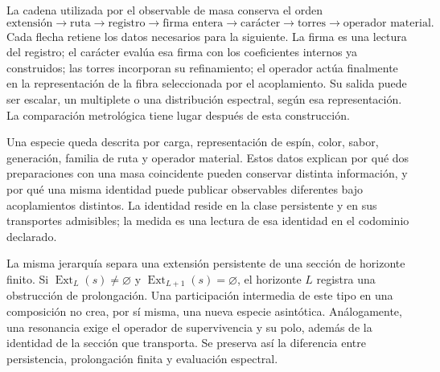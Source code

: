 La cadena utilizada por el observable de masa conserva el orden
\begin{equation}
 \text{extensión}\longrightarrow\text{ruta}\longrightarrow
 \text{registro}\longrightarrow\text{firma entera}\longrightarrow
 \text{carácter}\longrightarrow\text{torres}\longrightarrow
 \text{operador material}.
 \label{vi:vi:eq:cadena-material}
\end{equation}
Cada flecha retiene los datos necesarios para la siguiente. La firma es
una lectura del registro; el carácter evalúa esa firma con los
coeficientes internos ya construidos; las torres incorporan su
refinamiento; el operador actúa finalmente en la representación de la
fibra seleccionada por el acoplamiento. Su salida puede ser escalar,
un multiplete o una distribución espectral, según esa representación.
La comparación metrológica tiene lugar después de esta construcción.

Una especie queda descrita por carga, representación de espín, color,
sabor, generación, familia de ruta y operador material. Estos datos
explican por qué dos preparaciones con una masa coincidente pueden
conservar distinta información, y por qué una misma identidad puede
publicar observables diferentes bajo acoplamientos distintos. La
identidad reside en la clase persistente y en sus transportes admisibles;
la medida es una lectura de esa identidad en el codominio declarado.

La misma jerarquía separa una extensión persistente de una sección de
horizonte finito. Si $\operatorname{Ext}_L(s)\ne\varnothing$ y
$\operatorname{Ext}_{L+1}(s)=\varnothing$, el horizonte $L$ registra
una obstrucción de prolongación. Una participación intermedia de este
tipo en una composición no crea, por sí misma, una nueva especie
asintótica. Análogamente, una resonancia exige el operador de
supervivencia y su polo, además de la identidad de la sección que
transporta. Se preserva así la diferencia entre persistencia,
prolongación finita y evaluación espectral.
